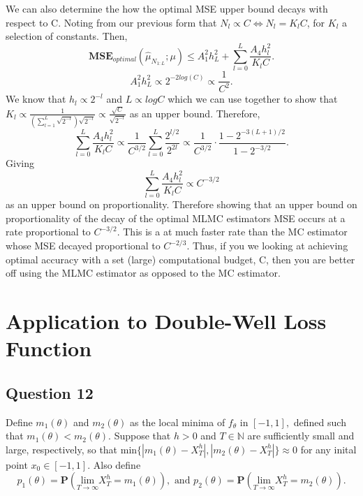 \documentclass{article}
\begin{document}
We can also determine the how the optimal MSE upper bound decays with respect to C. Noting from our previous form that $N_l \propto C \iff N_l=K_l C$, for $K_l$ a selection of constants. Then, 
\begin{equation}
\textbf{MSE}_{optimal}(\hat\mu_{N_{1:L}};\mu) \leq A_1^2h_L^2 + \sum_{l=0}^L \frac{A_4 h_l^2}{K_l C}.
\end{equation}
\begin{equation}
A_1^2h_L^2  \propto 2^{-2log(C)} \propto \frac{1}{C^2}.
\end{equation}
We know that $h_l \propto 2^{-l}$ and $L \propto log{C}$ which we can use together to show that $K_l \propto \frac{1}{ \left( \sum_{l=1}^L \sqrt{2^{-l}} \right) \sqrt{2^{-l}}} \propto \frac{\sqrt{C}}{\sqrt{2^{-l}}}$ as an upper bound. Therefore, 
\begin{equation*}
\sum_{l=0}^L \frac{A_4 h_l^2}{K_l C} \propto \frac{1}{C^{3/2}} \sum_{l=0}^L \frac{2^{l/2}}{2^{2l}} \propto \frac{1}{C^{3/2}} \cdot \frac{1-2^{-3(L+1)/2}}{1-2^{-3/2}}.
\end{equation*}
Giving
\begin{equation}
\sum_{l=0}^L \frac{A_4 h_l^2}{K_l C} \propto C^{-3/2}
\end{equation}
as an upper bound on proportionality. Therefore showing that an upper bound on proportionality of the decay of the optimal MLMC estimators MSE occurs at a rate proportional to $C^{-3/2}$. This is a at much faster rate than the MC estimator whose MSE decayed proportional to $C^{-2/3}$. Thus, if you we looking at achieving optimal accuracy with a set (large) computational budget, C, then you are better off using the MLMC estimator as opposed to the MC estimator.

\section{Application to Double-Well Loss Function}

\subsection{Question 12}
Define $m_1(\theta)$ and $m_2(\theta)$ as the local minima of $f_\theta$ in $[-1,1],$ defined such that $m_1(\theta)<m_2(\theta).$ Suppose that $h>0$ and $T\in \mathbb{N}$ are sufficiently small and large, respectively, so that $\text{min}\{|m_1(\theta)-X_T^h|, |m_2(\theta)-X_T^h|\} \approx 0$ for any inital point $x_0 \in [-1,1].$ Also define 
\begin{equation}
p_1(\theta)=\textbf{P} \left( \underset{T\to\infty}{\text{lim}} X_T^h=m_1(\theta) \right), \text{  and  } p_2(\theta)=\textbf{P} \left( \underset{T\to \infty}{\text{lim}} X_T^h=m_2(\theta) \right).
\end{equation}
\end{document}
